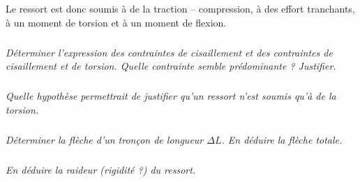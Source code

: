 \documentclass[10pt,fleqn]{article} %
\begin{document}
\begin{multicols}{2}
\begin{corrige}
Le ressort est donc soumis à de la traction -- compression, à des effort tranchants, à un moment de torsion et à un moment de flexion.

\end{corrige}
\else
\fi

\subparagraph{}\textit{Déterminer l'expression des contraintes de cisaillement et des contraintes de cisaillement et de torsion. Quelle contrainte semble prédominante ? Justifier.}


\subparagraph{}\textit{Quelle hypothèse permettrait de justifier qu'un ressort n'est soumis qu'à de la torsion.}


\subparagraph{}\textit{Déterminer la flèche d'un tronçon de longueur $\Delta L$. En déduire la flèche totale.}


\subparagraph{}\textit{En déduire la raideur (rigidité ?) du ressort.}
\ifprof
\else
\end{multicols}
\fi
\end{document}
